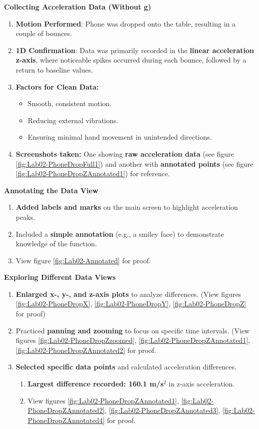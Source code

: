 \documentclass[idxtotoc,hyperref,openany]{labbook} %
\begin{document}
\textbf{Collecting Acceleration Data (Without g)}
\begin{enumerate}[$\bullet$]
    \item \textbf{Motion Performed}: Phone was dropped onto the table, resulting in a couple of bounces.
    \item \textbf{1D Confirmation}: Data was primarily recorded in the \textbf{linear acceleration z-axis}, where noticeable spikes occurred during each bounce, followed by a return to baseline values.
    \item \textbf{Factors for Clean Data:}
    \begin{itemize}[$\bullet$]
        \item Smooth, consistent motion.
        \item Reducing external vibrations.
        \item Ensuring minimal hand movement in unintended directions.
    \end{itemize}
    \item \textbf{Screenshots taken:} One showing \textbf{raw acceleration data} (see figure \ref{fig:Lab02-PhoneDropFull1}) and another with \textbf{annotated points} (see figure \ref{fig:Lab02-PhoneDropZAnnotated1}) for reference.
\end{enumerate}
\textbf{Annotating the Data View}
\begin{enumerate}[$\bullet$]
    \item \textbf{Added labels and marks} on the main screen to highlight acceleration peaks.
    \item Included a \textbf{simple annotation} (e.g., a smiley face) to demonstrate knowledge of the function.
    \item View figure \ref{fig:Lab02-Annotated} for proof.
\end{enumerate}
\textbf{Exploring Different Data Views}
\begin{enumerate}[$\bullet$]
    \item \textbf{Enlarged x-, y-, and z-axis plots} to analyze differences. (View figures \ref{fig:Lab02-PhoneDropX}, \ref{fig:Lab02-PhoneDropY}, \ref{fig:Lab02-PhoneDropZ} for proof)
    \item Practiced \textbf{panning and zooming} to focus on specific time intervals. (View figures \ref{fig:Lab02-PhoneDropZzoomed}, \ref{fig:Lab02-PhoneDropZAnnotated1}, \ref{fig:Lab02-PhoneDropZAnnotated2} for proof.
    \item \textbf{Selected specific data points} and calculated acceleration differences.
    \begin{enumerate}[$\bullet$]
        \item \textbf{Largest difference recorded: 160.1 m/s$^2$} in z-axis acceleration.
        \item View figures \ref{fig:Lab02-PhoneDropZAnnotated1}, \ref{fig:Lab02-PhoneDropZAnnotated2}, \ref{fig:Lab02-PhoneDropZAnnotated3}, \ref{fig:Lab02-PhoneDropZAnnotated4} for proof.
    \end{enumerate}
\end{enumerate}
\end{document}
